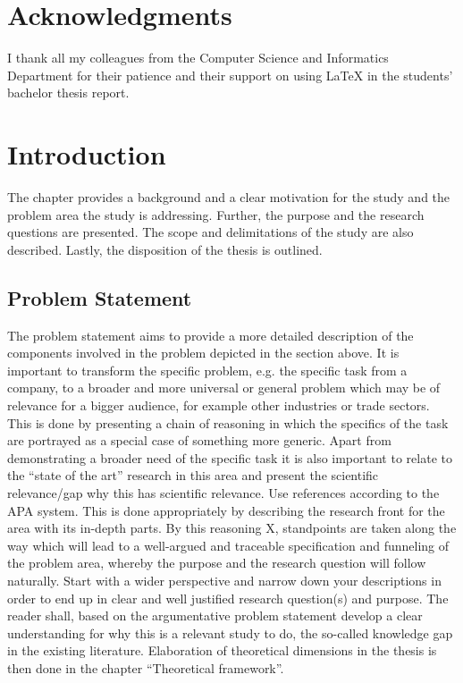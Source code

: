 \documentclass[a4paper, 12pt]{report}
\begin{document}
\newpage
\chapter*{Acknowledgments}
{}

I thank all my colleagues from the Computer Science and Informatics Department for their patience and their support on using LaTeX in the students' bachelor thesis report.



\chapter{Introduction}

\textcolor{jupurple}{
The chapter provides a background and a clear motivation for the study and the problem area the study is addressing. Further, the purpose and the research questions are presented. The scope and delimitations of the study are also described. Lastly, the disposition of the thesis is outlined.
}

\section{Problem Statement}

\textcolor{jupurple}{
The problem statement aims to provide a more detailed description of the components involved in the problem depicted in the section above. It is important to transform the specific problem, e.g. the specific task from a company, to a broader and more universal or general problem which may be of relevance for a bigger audience, for example other industries or trade sectors. This is done by presenting a chain of reasoning in which the specifics of the task are portrayed as a special case of something more generic.
Apart from demonstrating a broader need of the specific task it is also important to relate to the “state of the art” research in this area and present the scientific relevance/gap why this has scientific relevance. Use references according to the APA system. This is done appropriately by describing the research front for the area with its in-depth parts. By this reasoning X, standpoints are taken along the way which will lead to a well-argued and traceable specification and funneling of the problem area, whereby the purpose and the research question will follow naturally. 
Start with a wider perspective and narrow down your descriptions in order to end up in clear and well justified research question(s) and purpose. The reader shall, based on the argumentative problem statement develop a clear understanding for why this is a relevant study to do, the so-called knowledge gap in the existing literature.
Elaboration of theoretical dimensions in the thesis is then done in the chapter “Theoretical framework”.
}
\end{document}
